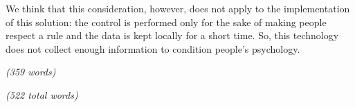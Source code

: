 We think that this consideration, however, does not apply to the implementation of this solution: the control is performed only for the sake of making people respect a rule and the data is kept locally for a short time. So, this technology does not collect enough information to condition people's psychology.

\emph{(359 words)}

\emph{(522 total words)}

